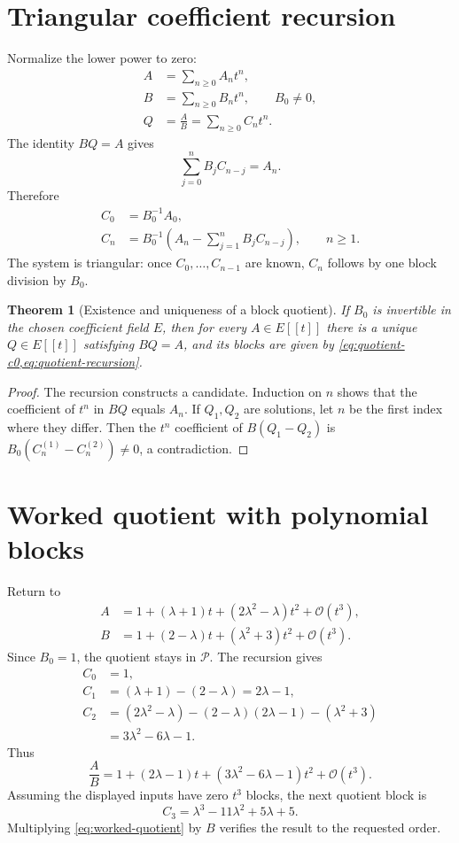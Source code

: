 \documentclass[11pt,openany]{book}
\theoremstyle{definition}
\theoremstyle{plain}
\newtheorem{theorem}{Theorem}[chapter]
\theoremstyle{remark}
\newcommand{\Plog}{\mathscr{P}}
\newcommand{\bigO}{\mathcal{O}}
\begin{document}
\section{Triangular coefficient recursion}
Normalize the lower power to zero:
\begin{align*}
 A&=\sum_{n\ge0}A_n t^n,\\
 B&=\sum_{n\ge0}B_n t^n,\qquad B_0\ne0,\\
 Q&=\frac AB=\sum_{n\ge0}C_n t^n.
\end{align*}
The identity \(BQ=A\) gives
\[
 \sum_{j=0}^{n}B_jC_{n-j}=A_n.
\]
Therefore
\begin{align}
 C_0&=B_0^{-1}A_0,\label{eq:quotient-c0}\\
 C_n&=B_0^{-1}
 \left(A_n-\sum_{j=1}^{n}B_jC_{n-j}\right),
 \qquad n\ge1.\label{eq:quotient-recursion}
\end{align}
The system is triangular: once \(C_0,\ldots,C_{n-1}\) are known, \(C_n\) follows by one block division by \(B_0\).

\begin{theorem}[Existence and uniqueness of a block quotient]\label{thm:block-quotient}
If \(B_0\) is invertible in the chosen coefficient field \(E\), then for every \(A\in E[[t]]\) there is a unique \(Q\in E[[t]]\) satisfying \(BQ=A\), and its blocks are given by \cref{eq:quotient-c0,eq:quotient-recursion}.
\end{theorem}

\begin{proof}
The recursion constructs a candidate. Induction on \(n\) shows that the coefficient of \(t^n\) in \(BQ\) equals \(A_n\). If \(Q_1,Q_2\) are solutions, let \(n\) be the first index where they differ. Then the \(t^n\) coefficient of \(B(Q_1-Q_2)\) is \(B_0(C_n^{(1)}-C_n^{(2)})\ne0\), a contradiction.
\end{proof}

\section{Worked quotient with polynomial blocks}
Return to
\begin{align*}
 A&=1+(\lambda+1)t+(2\lambda^2-\lambda)t^2+\bigO(t^3),\\
 B&=1+(2-\lambda)t+(\lambda^2+3)t^2+\bigO(t^3).
\end{align*}
Since \(B_0=1\), the quotient stays in \(\Plog\). The recursion gives
\begin{align*}
 C_0&=1,\\
 C_1&=(\lambda+1)-(2-\lambda)=2\lambda-1,\\
 C_2&=(2\lambda^2-\lambda)
 -(2-\lambda)(2\lambda-1)-(\lambda^2+3)\\
 &=3\lambda^2-6\lambda-1.
\end{align*}
Thus
\begin{equation}\label{eq:worked-quotient}
 \frac AB
 =1+(2\lambda-1)t+(3\lambda^2-6\lambda-1)t^2+\bigO(t^3).
\end{equation}
Assuming the displayed inputs have zero \(t^3\) blocks, the next quotient block is
\[
 C_3=\lambda^3-11\lambda^2+5\lambda+5.
\]
Multiplying \cref{eq:worked-quotient} by \(B\) verifies the result to the requested order.
\end{document}
